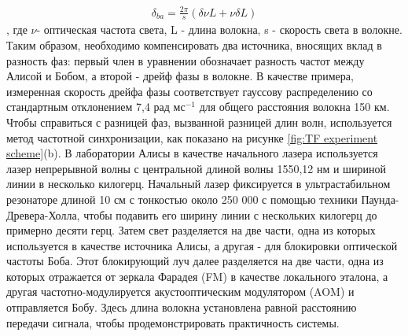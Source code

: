 \begin{align}
    \delta_{ba} = \frac{2\pi}{s}(\delta\nu L + \nu\delta L)
\end{align}\label{eq: TF phase fluct lit},
 где $\nu$- оптическая частота света, L - длина волокна, s - скорость света в волокне. Таким образом, необходимо компенсировать два источника, вносящих вклад в разность фаз: первый член в уравнении обозначает разность частот между Алисой и Бобом, а второй - дрейф фазы в волокне. В качестве примера, измеренная скорость дрейфа фазы соответствует гауссову распределению со стандартным отклонением 7,4 рад $мс^{-1}$ для общего расстояния волокна 150 км. Чтобы справиться с разницей фаз, вызванной разницей длин волн, используется метод частотной синхронизации, как показано на рисунке \ref{fig:TF experiment scheme}(b). В лаборатории Алисы в качестве начального лазера используется лазер непрерывной волны с центральной длиной волны 1550,12 нм и шириной линии в несколько килогерц. Начальный лазер фиксируется в ультрастабильном резонаторе длиной 10 см с тонкостью около 250 000 с помощью техники Паунда-Древера-Холла, чтобы подавить его ширину линии с нескольких килогерц до примерно десяти герц. Затем свет разделяется на две части, одна из которых используется в качестве источника Алисы, а другая - для блокировки оптической частоты Боба. Этот блокирующий луч далее разделяется на две части, одна из которых отражается от зеркала Фарадея (FM) в качестве локального эталона, а другая частотно-модулируется акустооптическим модулятором (AOM) и отправляется Бобу. Здесь длина волокна установлена равной расстоянию передачи сигнала, чтобы продемонстрировать практичность системы.

